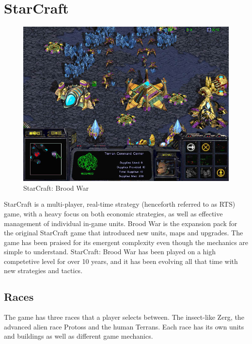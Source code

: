 
\section{StarCraft}
\label{sec:starcrafttheory}


\begin{figure}[h!tb]
\centering
\includegraphics[scale=0.5]{graphics/scbw.jpg}
\caption{StarCraft: Brood War}
\label{fig:scbwIntro}
\end{figure}

StarCraft is a multi-player, real-time strategy (henceforth referred to as RTS) game, with a heavy focus on both economic strategies, as well as effective management of individual in-game units. Brood War is the expansion pack for the original StarCraft game that introduced new units, maps and upgrades. The game has been praised for its emergent complexity even though the mechanics are simple to understand. StarCraft: Brood War has been played on a high competetive level for over 10 years, and it has been evolving all that time with new strategies and tactics.

\subsection{Races}
The game has three races that a player selects between. The insect-like Zerg, the advanced alien race Protoss and the human
Terrans. Each race has its own units and buildings as well as different game mechanics.

